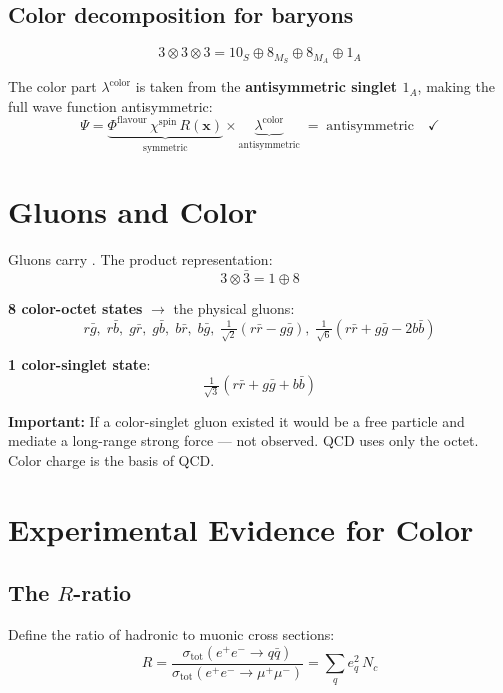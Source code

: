 \subsection{Color decomposition for baryons}

\[
  3 \otimes 3 \otimes 3 = 10_S \oplus 8_{M_S} \oplus 8_{M_A} \oplus 1_A
\]

The color part $\lambda^{\mathrm{color}}$ is taken from the \textbf{antisymmetric singlet
$1_A$}, making the full wave function antisymmetric:
\[
  \Psi
  = \underbrace{\Phi^{\mathrm{flavour}}\, \chi^{\mathrm{spin}}\, R(\mathbf{x})}_{\text{symmetric}}
    \times
    \underbrace{\lambda^{\mathrm{color}}}_{\text{antisymmetric}}
  \;=\; \text{antisymmetric} \quad \checkmark
\]

\section{Gluons and Color}

Gluons carry . The product representation:
\[
  3 \otimes \bar{3} = 1 \oplus 8
\]

\textbf{8 color-octet states} $\to$ the physical gluons:
\[
  r\bar{g},\; r\bar{b},\; g\bar{r},\; g\bar{b},\; b\bar{r},\; b\bar{g},\;
  \tfrac{1}{\sqrt{2}}(r\bar{r}-g\bar{g}),\;
  \tfrac{1}{\sqrt{6}}(r\bar{r}+g\bar{g}-2b\bar{b})
\]

\textbf{1 color-singlet state}:
\[
  \tfrac{1}{\sqrt{3}}(r\bar{r}+g\bar{g}+b\bar{b})
\]

\begin{notebox}
  \textbf{Important:} If a color-singlet gluon existed it would be a free particle and
  mediate a long-range strong force --- not observed. QCD uses only the octet.
  Color charge is the basis of QCD.
\end{notebox}

\section{Experimental Evidence for Color}

\subsection{The \texorpdfstring{$R$}{R}-ratio}

Define the ratio of hadronic to muonic cross sections:
\[
  R
  = \frac{\sigma_{\mathrm{tot}}(e^+e^- \to q\bar{q})}
         {\sigma_{\mathrm{tot}}(e^+e^- \to \mu^+\mu^-)}
  = \sum_q e_q^2\, N_c
\]

